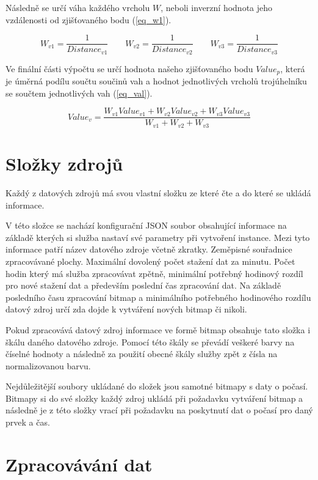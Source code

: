 \documentclass[czech,bachelor,dept460,male,csharp,cpdeclaration]{diploma}
\begin{document}
	Následně se určí váha každého vrcholu $W$, neboli inverzní hodnota jeho vzdálenosti od zjišťovaného bodu (\ref{eq_w1}).
	
	\begin{equation}\label{eq_w1}
		W_{v1} =\frac{1}{Distance_{v1}}
		\quad\mathrm{ }\quad 
		W_{v2} =\frac{1}{Distance_{v2}}
		\quad\mathrm{ }\quad 
		W_{v3} =\frac{1}{Distance_{v3}} 
	\end{equation}
	
	Ve finální části výpočtu se určí hodnota našeho zjišťovaného bodu $Value_p$, která je úměrná podílu součtu součinů vah a hodnot jednotlivých vrcholů trojúhelníku se součtem jednotlivých vah (\ref{eq_val}).
	
	\begin{equation}\label{eq_val}
		Value_v = \frac{W_{v1}Value_{v1} + W_{v2}Value_{v2} + W_{v3}Value_{v3}}{W_{v1} + W_{v2} + W_{v3}}
	\end{equation}
	
	\section{Složky zdrojů}
	
	Každý z datových zdrojů má svou vlastní složku ze které čte a do které se ukládá informace.
	
	V této složce se nachází konfigurační JSON soubor obsahující informace na základě kterých si služba nastaví své parametry při vytvoření instance. Mezi tyto informace patří název datového zdroje včetně zkratky. Zeměpisné souřadnice zpracovávané plochy. Maximální dovolený počet stažení dat za minutu. Počet hodin který má služba zpracovávat zpětně, minimální potřebný hodinový rozdíl pro nové stažení dat a především poslední čas zpracování dat. Na základě posledního času zpracování bitmap a minimálního potřebného hodinového rozdílu datový zdroj určí zda dojde k vytváření nových bitmap či nikoli.
	
	Pokud zpracovává datový zdroj informace ve formě bitmap obsahuje tato složka i škálu daného datového zdroje. Pomocí této škály se převádí veškeré barvy na číselné hodnoty a následně za použití obecné škály služby zpět z čísla na normalizovanou barvu.
	
	Nejdůležitější soubory ukládané do složek jsou samotné bitmapy s daty o počasí. Bitmapy si do své složky každý zdroj ukládá při požadavku vytváření bitmap a následně je z této složky vrací při požadavku na poskytnutí dat o počasí pro daný prvek a čas.
	
	\section{Zpracovávání dat}
	
\end{document}
